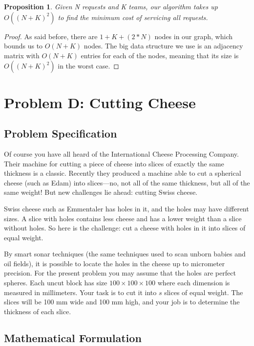 \documentclass[12pt]{article}
\newtheorem{proposition}[theorem]{Proposition}
\begin{document}
\begin{proposition}
    Given N requests and K teams, our algorithm takes up
    $O((N+K)^2)$ to find the minimum cost of servicing
    all requests.
\end{proposition}

\begin{proof}
    As said before, there are $1 + K + (2 * N)$ nodes in our
    graph, which bounds us to $O(N+K)$ nodes. The big data
    structure we use is an adjacency matrix with $O(N+K)$
    entries for each of the nodes, meaning that its size
    is $O((N+K)^2)$ in the worst case.
\end{proof}

\newpage

\section{Problem D: Cutting Cheese}

\subsection{Problem Specification}

Of course you have all heard of the International Cheese Processing
Company. Their machine for cutting a piece of cheese into slices
of exactly the same thickness is a classic. Recently they produced
a machine able to cut a spherical cheese (such as Edam) into
slices---no, not all of the same thickness, but all of the
same weight! But new challenges lie ahead: cutting Swiss cheese.

Swiss cheese such as Emmentaler has holes in it, and the holes may
have different sizes. A slice with holes contains less cheese and
has a lower weight than a slice without holes. So here is the
challenge: cut a cheese with holes in it into slices of equal weight.

By smart sonar techniques (the same techniques used to scan unborn
babies and oil fields), it is possible to locate the holes in the
cheese up to micrometer precision. For the present problem you may
assume that the holes are perfect spheres. Each uncut block has size
$100 \times 100 \times 100$ where each dimension is measured in millimeters.
Your task is to cut it into $s$ slices of equal weight. The slices
will be 100 mm wide and 100 mm high, and your job is to determine the
thickness of each slice.

\subsection{Mathematical Formulation}
\end{document}
